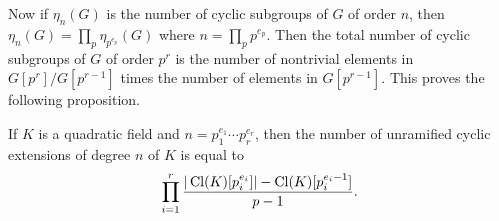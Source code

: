 Now if $\eta_n(G)$ is the number of cyclic subgroups of $G$ of order $n$, then
$\eta_n(G) = \prod_p \eta_{p^{e_p}}(G)$ where $n = \prod_p p^{e_p}$. Then the
total number of cyclic subgroups of $G$ of order $p^r$ is the number of
nontrivial elements in $G[p^r]/G[p^{r-1}]$ times the number of elements in
$G[p^{r-1}]$. This proves the following proposition.

\begin{prop}\label{prop:exttoclass}
  If $K$ is a quadratic field and $n = p_1^{e_1} \cdots p_r^{e_r}$, then the number
  of unramified cyclic extensions of degree $n$ of $K$ is equal to
  \[ \prod_{i=1}^r \frac{|\operatorname{Cl}(K)[p_i^{e_i}]| - \operatorname{Cl}(K)[p_i^{e_i-1}]}{p - 1}. \]
\end{prop}

